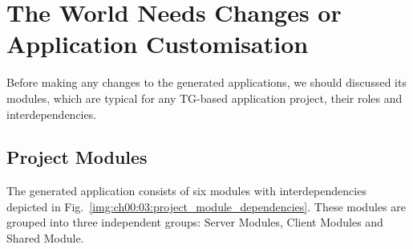 \chapter{The World Needs Changes or Application Customisation}\label{ch00:03}


  Before making any changes to the generated applications, we should discussed its modules, which are typical for any TG-based application project, their roles and interdependencies.

\section{Project Modules}
  The generated application consists of six modules with interdependencies depicted in Fig.~\ref{img:ch00:03:project_module_dependencies}.
  These modules are grouped into three independent groups: Server Modules, Client Modules and Shared Module.
  
